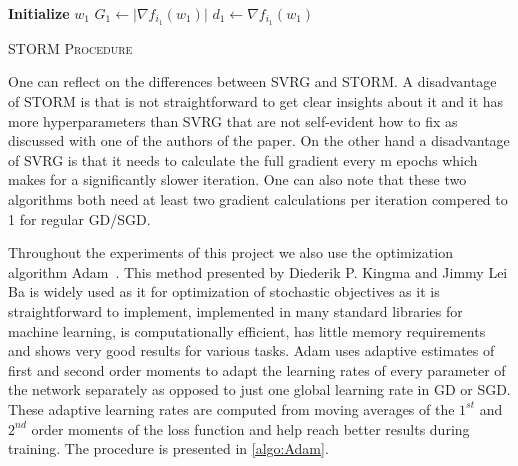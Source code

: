 \documentclass[a4paper,11pt,oneside]{report}
\begin{document}
\begin{algorithm}[H]
    \DontPrintSemicolon
    \SetAlgoNoLine

    \textbf{Initialize} $w_1$\;
    $G_1 \gets \mathopen| {\nabla f_{i_1}(w_1)}\mathclose|$\;
    $d_1 \gets \nabla f_{i_1}(w_1)$\;
    \caption{{\textsc{STORM Procedure}}}
    \label{algo:storm}
\end{algorithm}

One can reflect on the differences between SVRG and STORM. A disadvantage of STORM is that is not straightforward to get clear insights about it and it has more hyperparameters than SVRG that are not self-evident how to fix as discussed with one of the authors of the paper.  On the other hand a disadvantage of SVRG is that it needs to calculate the full gradient every m epochs which makes for a significantly slower iteration. One can also note that these two algorithms both need at least two gradient calculations per iteration compered to 1 for regular GD/SGD.

Throughout the experiments of this project we also use the optimization algorithm Adam~\cite{kingma2014adam}. This method presented by Diederik P. Kingma and Jimmy Lei Ba is widely used as it for optimization of stochastic objectives as it is straightforward to implement, implemented in many standard libraries for machine learning, is computationally efficient,
has little memory requirements and shows very good results for various tasks. Adam uses adaptive estimates of first and second order moments to adapt the learning rates of every parameter of the network separately as opposed to just one global learning rate in GD or SGD. These adaptive learning rates are computed from moving averages of the $1^{st}$ and $2^{nd}$ order moments of the loss function and help reach better results during training. The procedure is presented in \autoref{algo:Adam}. 
 
\end{document}
